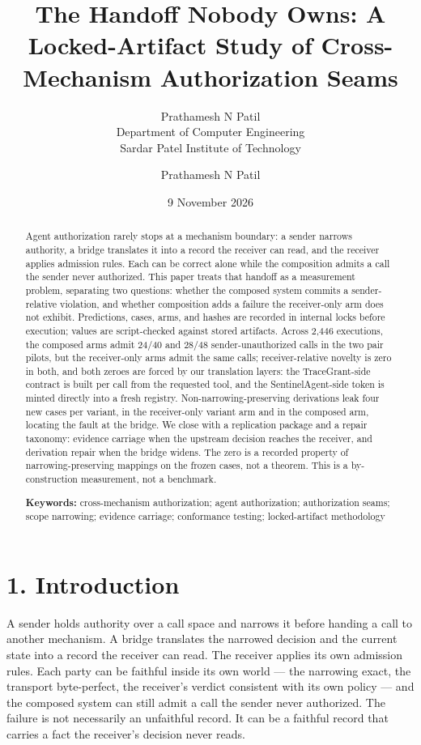 \documentclass[
  10pt,
]{article}
\author{Prathamesh N Patil\\Department of Computer Engineering\\Sardar Patel Institute of Technology}%
\title{The Handoff Nobody Owns: A Locked-Artifact Study of
Cross-Mechanism Authorization Seams}
\author{Prathamesh N Patil}
\date{9 November 2026}
\renewcommand{\_}{\allowbreak\origunderscore}
\begin{document}
\maketitle

\begin{abstract}

Agent authorization rarely stops at a mechanism boundary: a sender
narrows authority, a bridge translates it into a record the receiver can
read, and the receiver applies admission rules. Each can be correct
alone while the composition admits a call the sender never authorized.
This paper treats that handoff as a measurement problem, separating two
questions: whether the composed system commits a sender-relative
violation, and whether composition adds a failure the receiver-only arm
does not exhibit. Predictions, cases, arms, and hashes are recorded in
internal locks before execution; values are script-checked against
stored artifacts. Across 2,446 executions, the composed arms admit 24/40
and 28/48 sender-unauthorized calls in the two pair pilots, but the
receiver-only arms admit the same calls; receiver-relative novelty is
zero in both, and both zeroes are forced by our translation layers: the
TraceGrant-side contract is built per call from the requested tool, and
the SentinelAgent-side token is minted directly into a fresh registry.
Non-narrowing-preserving derivations leak four new cases per variant, in
the receiver-only variant arm and in the composed arm, locating the
fault at the bridge. We close with a replication package and a repair
taxonomy: evidence carriage when the upstream decision reaches the
receiver, and derivation repair when the bridge widens. The zero is a
recorded property of narrowing-preserving mappings on the frozen cases,
not a theorem. This is a by-construction measurement, not a benchmark.

\textbf{Keywords:} cross-mechanism authorization; agent authorization;
authorization seams; scope narrowing; evidence carriage; conformance
testing; locked-artifact methodology

\end{abstract}

\section{1. Introduction}\label{introduction}

A sender holds authority over a call space and narrows it before handing
a call to another mechanism. A bridge translates the narrowed decision
and the current state into a record the receiver can read. The receiver
applies its own admission rules. Each party can be faithful inside its
own world --- the narrowing exact, the transport byte-perfect, the
receiver's verdict consistent with its own policy --- and the composed
system can still admit a call the sender never authorized. The failure
is not necessarily an unfaithful record. It can be a faithful record
that carries a fact the receiver's decision never reads.
\end{document}
